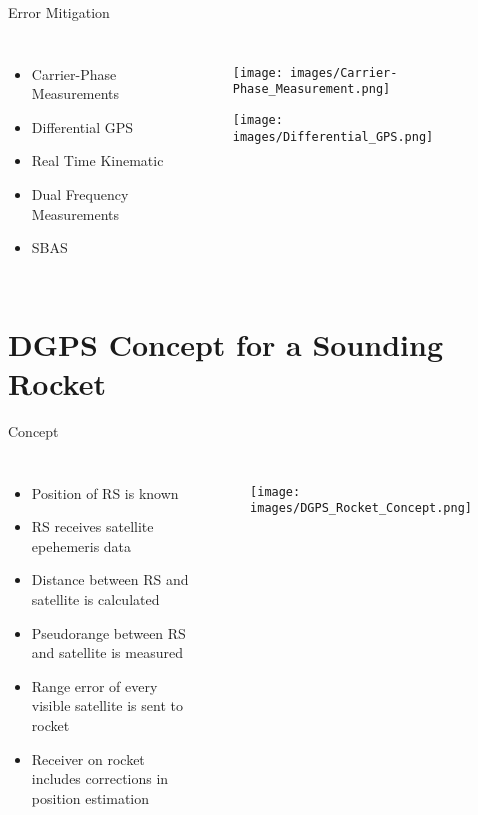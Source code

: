 \documentclass[12pt, compress, xcolor=table]{beamer}
\begin{document}
\begin{frame}{Error Mitigation}
  \begin{columns}
  \begin{itemize}
  \setlength\itemsep{0.5cm}
   \item Carrier-Phase Measurements
   \item Differential GPS
   \item Real Time Kinematic
   \item Dual Frequency Measurements
   \item SBAS
  \end{itemize}

  \begin{figure}
   \texttt{[image: images/Carrier-Phase\_Measurement.png]}
  
  \texttt{[image: images/Differential\_GPS.png]}
  \end{figure}   
  
 \end{columns}
\end{frame}


\section{DGPS Concept for a Sounding Rocket}

\begin{frame}{Concept}
 \begin{columns}
  \begin{itemize}
   \footnotesize
   \item Position of RS is known
   \item RS receives satellite epehemeris data
   \item Distance between RS and satellite is calculated
   \item Pseudorange between RS and satellite is measured
   \item Range error of every visible satellite is sent to rocket
   \item Receiver on rocket includes corrections in position estimation
  \end{itemize}

  \begin{figure}
   \texttt{[image: images/DGPS\_Rocket\_Concept.png]}
  \end{figure}   
  
 \end{columns}
\end{frame}
\end{document}
